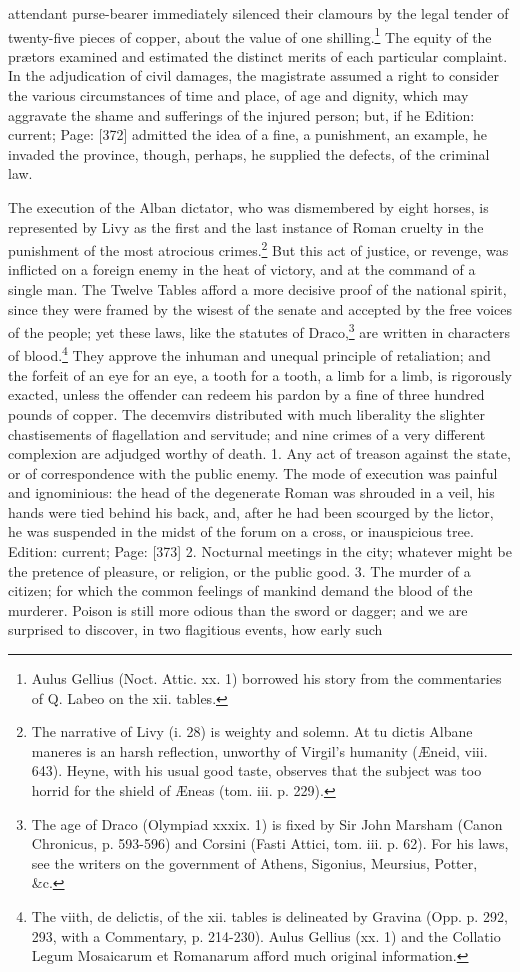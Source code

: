 attendant purse-bearer immediately silenced their clamours by the legal tender of twenty-five pieces of copper, about the value of one shilling.\footnote{Aulus Gellius (Noct. Attic. xx. 1) borrowed his story from the commentaries of Q. Labeo on the xii. tables.} The equity of the prætors examined and estimated the distinct merits of each particular complaint. In the adjudication of civil damages, the magistrate assumed a right to consider the various circumstances of time and place, of age and dignity, which may aggravate the shame and sufferings of the injured person; but, if he Edition: current; Page: [372] admitted the idea of a fine, a punishment, an example, he invaded the province, though, perhaps, he supplied the defects, of the criminal law.

The execution of the Alban dictator, who was dismembered by eight horses, is represented by Livy as the first and the last instance of Roman cruelty in the punishment of the most atrocious crimes.\footnote{The narrative of Livy (i. 28) is weighty and solemn. At tu dictis Albane maneres is an harsh reflection, unworthy of Virgil\texthebrew{}’s humanity (Æneid, viii. 643). Heyne, with his usual good taste, observes that the subject was too horrid for the shield of Æneas (tom. iii. p. 229).} But this act of justice, or revenge, was inflicted on a foreign enemy in the heat of victory, and at the command of a single man. The Twelve Tables afford a more decisive proof of the national spirit, since they were framed by the wisest of the senate and accepted by the free voices of the people; yet these laws, like the statutes of Draco,\footnote{The age of Draco (Olympiad xxxix. 1) is fixed by Sir John Marsham (Canon Chronicus, p. 593-596) and Corsini (Fasti Attici, tom. iii. p. 62). For his laws, see the writers on the government of Athens, Sigonius, Meursius, Potter, \&c.} are written in characters of blood.\footnote{The viith, de delictis, of the xii. tables is delineated by Gravina (Opp. p. 292, 293, with a Commentary, p. 214-230). Aulus Gellius (xx. 1) and the Collatio Legum Mosaicarum et Romanarum afford much original information.} They approve the inhuman and unequal principle of retaliation; and the forfeit of an eye for an eye, a tooth for a tooth, a limb for a limb, is rigorously exacted, unless the offender can redeem his pardon by a fine of three hundred pounds of copper. The decemvirs distributed with much liberality the slighter chastisements of flagellation and servitude; and nine crimes of a very different complexion are adjudged worthy of death. 1. Any act of treason against the state, or of correspondence with the public enemy. The mode of execution was painful and ignominious: the head of the degenerate Roman was shrouded in a veil, his hands were tied behind his back, and, after he had been scourged by the lictor, he was suspended in the midst of the forum on a cross, or inauspicious tree. Edition: current; Page: [373] 2. Nocturnal meetings in the city; whatever might be the pretence of pleasure, or religion, or the public good. 3. The murder of a citizen; for which the common feelings of mankind demand the blood of the murderer. Poison is still more odious than the sword or dagger; and we are surprised to discover, in two flagitious events, how early such 